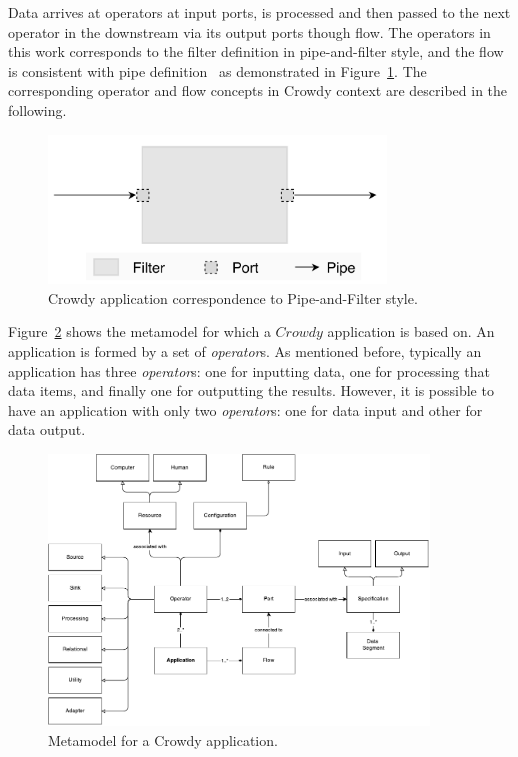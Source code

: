 Data arrives at operators at input ports, is processed and then passed to the next operator 
in the downstream via its output ports though flow. The operators in this work corresponds 
to the filter definition in pipe-and-filter style, and the flow is consistent with pipe 
definition~\cite{Clements} as demonstrated in Figure~\ref{fig:pipefilter}. The corresponding 
operator and flow concepts in Crowdy context are described in the following. 

\begin{figure}[ht]
	\centering
	\includegraphics[width=0.8\textwidth]{figures/architecture/PipeFilter.png}
	\caption{Crowdy application correspondence to Pipe-and-Filter style.}
	\label{fig:pipefilter}
\end{figure}

Figure~\ref{fig:metamodel} shows the metamodel for which a $Crowdy$ application is 
based on. An application is formed by a set of \textit{operator}s. As mentioned before, 
typically an application has three \textit{operator}s: one for inputting data, one for processing 
that data items, and finally one for outputting the results. However, it is possible to 
have an application with only two \textit{operator}s: one for data input and other for data 
output.

\begin{figure}[ht]
	\centering
	\includegraphics[width=0.9\textwidth]{figures/ApplicationMetamodel.pdf}
	\caption{Metamodel for a Crowdy application.}
	\label{fig:metamodel}
\end{figure}

